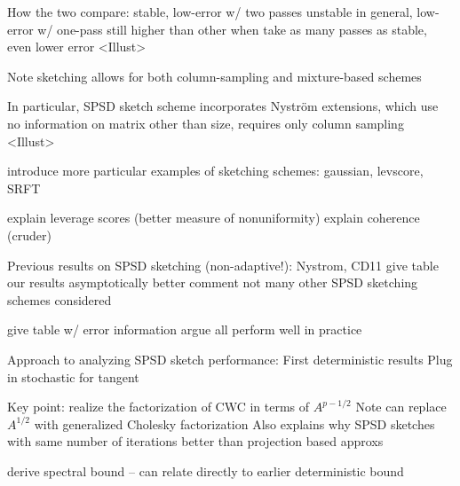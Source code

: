 \documentclass[xcolor={svgnames,pdftex,dvipsnames,table},10pt]{beamer} %
\begin{document}
\begin{frame}
 How the two compare: 
 stable, low-error w/ two passes
 unstable in general, low-error w/ one-pass still higher than other 
 when take as many passes as stable, even lower error
 <Illust>
\end{frame}

\begin{frame}
Note sketching allows for both column-sampling and mixture-based schemes

In particular, SPSD sketch scheme incorporates Nystr\"om extensions, which use
 no information on matrix other than size, requires only column sampling
 <Illust>
\end{frame}

\begin{frame}
 introduce more particular examples of sketching schemes: gaussian, levscore, SRFT
\end{frame}

\begin{frame}
 explain leverage scores (better measure of nonuniformity)
 explain coherence (cruder)
\end{frame}

\begin{frame}
 Previous results on SPSD sketching (non-adaptive!):
 Nystrom, CD11
 give table
 our results asymptotically better
 comment not many other SPSD sketching schemes considered 
\end{frame}

\begin{frame}
 give table w/ error information
 argue all perform well in practice
\end{frame}

\begin{frame}
 Approach to analyzing SPSD sketch performance:
 First deterministic results
 Plug in stochastic for tangent
\end{frame}

\begin{frame}
 Key point: realize the factorization of CWC in terms of $A^{p- 1/2}$
 Note can replace $A^{1/2}$ with generalized Cholesky factorization
 Also explains why SPSD sketches with same number of iterations better
 than projection based approxs
\end{frame}

\begin{frame}
 derive spectral bound -- can relate directly to earlier deterministic bound
\end{frame}
\end{document}
